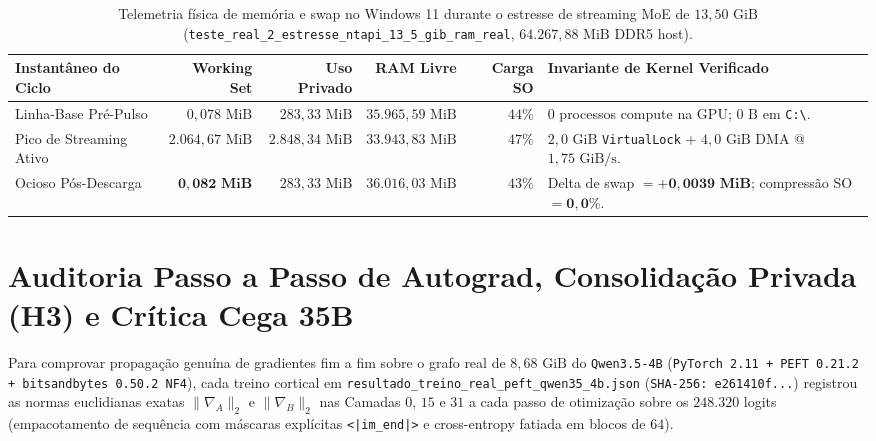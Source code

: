 \documentclass[10pt,a4paper]{article}
\begin{document}
\begin{table}[!htbp]
\centering
\caption{Telemetria f\'isica de mem\'oria e swap no Windows 11 durante o estresse de streaming MoE de $13,50\text{ GiB}$ (\texttt{teste\_\allowbreak{}real\_\allowbreak{}2\_\allowbreak{}estresse\_\allowbreak{}ntapi\_\allowbreak{}13\_\allowbreak{}5\_\allowbreak{}gib\_\allowbreak{}ram\_\allowbreak{}real}, $64.267,88\text{ MiB}$ DDR5 host).}
\label{tab:ntapi}
\footnotesize
\begin{tabularx}{\linewidth}{@{}lrrrrY@{}}
\toprule
\textbf{Instant\^aneo do Ciclo} & \textbf{Working Set} & \textbf{Uso Privado} & \textbf{RAM Livre} & \textbf{Carga SO} & \textbf{Invariante de Kernel Verificado} \\
\midrule
Linha-Base Pr\'e-Pulso & $0,078\text{ MiB}$ & $283,33\text{ MiB}$ & $35.965,59\text{ MiB}$ & $44\%$ & $0$ processos compute na GPU; $0\text{ B}$ em \texttt{C:\textbackslash}. \\
Pico de Streaming Ativo & $2.064,67\text{ MiB}$ & $2.848,34\text{ MiB}$ & $33.943,83\text{ MiB}$ & $47\%$ & $2,0\text{ GiB}$ \texttt{VirtualLock} + $4,0\text{ GiB}$ DMA @ $1,75\text{ GiB/s}$. \\
Ocioso P\'os-Descarga & $\mathbf{0,082\text{ MiB}}$ & $283,33\text{ MiB}$ & $36.016,03\text{ MiB}$ & $43\%$ & Delta de swap $= \mathbf{+0,0039\text{ MiB}}$; compress\~ao SO $= \mathbf{0,0\%}$. \\
\bottomrule
\end{tabularx}
\end{table}

\section{Auditoria Passo a Passo de Autograd, Consolida\c{c}\~ao Privada (H3) e Cr\'itica Cega 35B}

Para comprovar propaga\c{c}\~ao genu\'ina de gradientes fim a fim sobre o grafo real de $8,68\text{ GiB}$ do \texttt{Qwen3.5-4B} (\texttt{PyTorch 2.11 + PEFT 0.21.2 + bitsandbytes 0.50.2 NF4}), cada treino cortical em \texttt{resultado\_\allowbreak{}treino\_\allowbreak{}real\_\allowbreak{}peft\_\allowbreak{}qwen35\_\allowbreak{}4b.json} (\texttt{SHA-256: e261410f...}) registrou as normas euclidianas exatas $\|\nabla_A\|_2$ e $\|\nabla_B\|_2$ nas Camadas $0$, $15$ e $31$ a cada passo de otimiza\c{c}\~ao sobre os $248.320$ logits (empacotamento de sequ\^encia com m\'ascaras expl\'icitas \texttt{<|im\_\allowbreak{}end|>} e cross-entropy fatiada em blocos de $64$).
\end{document}
